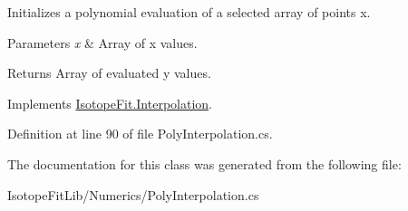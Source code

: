 Initializes a polynomial evaluation of a selected array of points x. 


\begin{DoxyParams}{Parameters}
{\em x} & Array of x values.\\
\hline
\end{DoxyParams}
\begin{DoxyReturn}{Returns}
Array of evaluated y values.
\end{DoxyReturn}


Implements \mbox{\hyperlink{class_isotope_fit_1_1_interpolation}{Isotope\+Fit.\+Interpolation}}.



Definition at line 90 of file Poly\+Interpolation.\+cs.



The documentation for this class was generated from the following file\+:\begin{DoxyCompactItemize}
\item 
Isotope\+Fit\+Lib/\+Numerics/Poly\+Interpolation.\+cs\end{DoxyCompactItemize}
